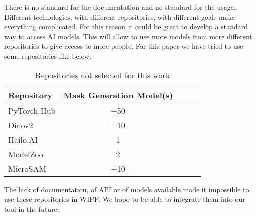 There is no standard for the documentation and no standard for the usage.
Different technologies, with different repositories, with different goals make
everything complicated. For this reason it could be great to develop a standard
way to access AI models. This will allow to use more models from more different
repositories to give access to more people. For this paper we have tried to use
some repositories like below.

\begin{table}[H]
    \centering
    \caption{\label{tab:discussion}%
        Repositories not selected for this work
    }
    \begin{tabular}{lcccc}
      \toprule
      Repository & Mask Generation Model(s) \\
      \midrule
      PyTorch Hub & +50 \\
      Dinov2 & +10 \\
      Hailo.AI & 1 \\
      ModelZoo & 2 \\
      MicroSAM & +10 \\
      \bottomrule
    \end{tabular}
\end{table}

The lack of documentation, of API or of models available made it impossible to
use these repositories in WIPP. We hope to be able to integrate them into our
tool in the future.
